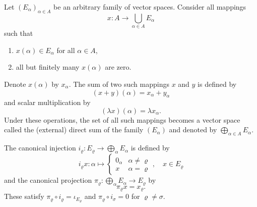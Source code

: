 Let $(E_\alpha)_{\alpha \in A}$ be an arbitrary family of vector spaces. Consider all mappings
$$x: A \to \bigcup_{\alpha \in A} E_\alpha$$
such that
\begin{enumerate}
\item $x(\alpha) \in E_\alpha$ for all $\alpha \in A$,
\item all but finitely many $x(\alpha)$ are zero.
\end{enumerate}
Denote $x(\alpha)$ by $x_\alpha$. The sum of two such mappings $x$ and $y$ is defined by
$$(x + y)(\alpha) = x_\alpha + y_\alpha$$
and scalar multiplication by
$$(\lambda x)(\alpha) = \lambda x_\alpha.$$
Under these operations, the set of all such mappings becomes a vector space called the (external) direct sum of the family $(E_\alpha)$ and denoted by $\bigoplus_{\alpha \in A} E_\alpha$.

The canonical injection $i_\varrho: E_\varrho \to \bigoplus_{\alpha} E_\alpha$ is defined by
$$i_\varrho x: \alpha \mapsto \begin{cases} 0_\alpha & \alpha \neq \varrho \\ x & \alpha = \varrho \end{cases}, \quad x \in E_\varrho$$
and the canonical projection $\pi_\varrho: \bigoplus_{\alpha} E_\alpha \to E_\varrho$ by
$$\pi_\varrho x = x_\varrho.$$
These satisfy $\pi_\varrho \circ i_\varrho = \iota_{E_\varrho}$ and $\pi_\varrho \circ i_\sigma = 0$ for $\varrho \neq \sigma$.
